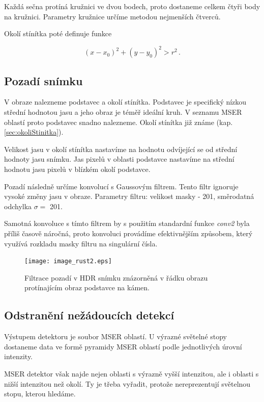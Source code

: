 Každá sečna protíná kružnici ve dvou bodech, proto dostaneme celkem čtyři body na kružnici. Parametry kružnice určíme metodou nejmenších čtverců. 

Okolí stínítka poté definuje funkce 

\begin{equation}
	\left(x-x_0\right)^2 + \left(y-y_0\right)^2 > r^2\,.
	\label{eq:kruzniceOkoli}
	\end{equation}




\subsection{Pozadí snímku}
	V obraze nalezneme podstavec a okolí stínítka. Podstavec je specifický nízkou střední hodnotou jasu a jeho obraz je téměř ideální kruh. V seznamu MSER oblastí proto podstavec snadno nalezneme. Okolí stínítka již známe (kap. \ref{sec:okoliStinitka}).
	
	Velikost jasu v okolí stínítka nastavíme na hodnotu odvíjející se od střední hodnoty jasu snímku. Jas pixelů v oblasti podstavce nastavíme na střední hodnotu jasu pixelů v blízkém okolí podstavce.  
	
	Pozadí následně určíme konvolucí s Gaussovým filtrem. Tento filtr ignoruje vysoké změny jasu v obraze. Parametry filtru: velikost masky - \SI{201}{\px}, směrodatná odchylka $\sigma = $ \SI{201}{\px}.
	
	Samotná konvoluce s tímto filtrem by s použitím standardní funkce \textit{conv2} byla příliš časově náročná, proto konvoluci provádíme efektivnějším způsobem, který využívá rozkladu masky filtru na singulární čísla.
	
\begin{figure}[htbp]
    \centering\texttt{[image: image\_rust2.eps]}
     \caption[Filtrace pozadí.]{Filtrace pozadí v HDR snímku znázorněná v řádku obrazu protínajícím obraz podstavce na kámen.}
        \label{fig:pozadi}
\end{figure}
	     
	     \newpage
\subsection{Odstranění nežádoucích detekcí}

Výstupem detektoru je soubor MSER oblastí. U výrazné světelné stopy dostaneme data ve formě pyramidy MSER oblastí podle jednotlivých úrovní intenzity. 

MSER detektor však najde nejen oblasti s výrazně vyšší intenzitou, ale i oblasti s nižší intenzitou než okolí. Ty je třeba vyřadit, protože nereprezentují světelnou stopu, kterou hledáme. 

